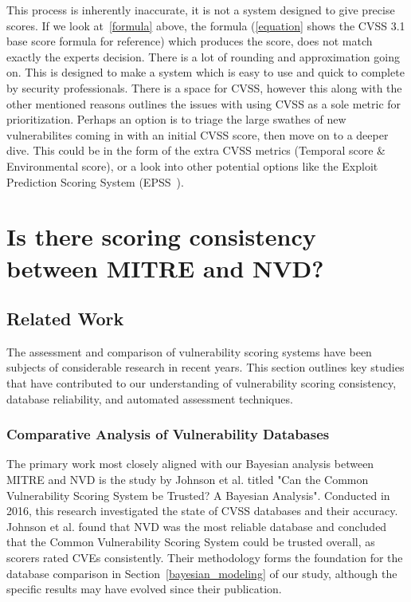 \documentclass[12pt]{article}
\begin{document}
This process is inherently inaccurate, it is not a system designed to give precise scores. If we
look at~\ref{formula} above, the formula (\ref{equation} shows the CVSS 3.1 base score formula for
reference) which produces the score, does not match exactly the experts decision. There is a lot of
rounding and approximation going on. This is designed to make a system which is easy to use and
quick to complete by security professionals. There is a space for CVSS, however this along with the
other mentioned reasons outlines the issues with using CVSS as a sole metric for prioritization. Perhaps an option
is to triage the large swathes of new vulnerabilites coming in with an initial CVSS score, then move
on to a deeper dive. This could be in the form of the extra CVSS metrics (Temporal score \&
Environmental score), or a look into other potential options like the Exploit Prediction Scoring
System (EPSS~\cite{EPSS}).

\section{Is there scoring consistency between MITRE and NVD?}

\subsection{Related Work}

The assessment and comparison of vulnerability scoring systems have been subjects of considerable
research in recent years. This section outlines key studies that have contributed to our
understanding of vulnerability scoring consistency, database reliability, and automated assessment
techniques.

\subsubsection*{Comparative Analysis of Vulnerability Databases}

The primary work most closely aligned with our Bayesian analysis between MITRE and NVD is the study
by Johnson et al. titled "Can the Common Vulnerability Scoring System be Trusted? A Bayesian
Analysis"\cite{bayes}. Conducted in 2016, this research investigated the state of CVSS databases and
their accuracy. Johnson et al. found that NVD was the most reliable database and concluded that the
Common Vulnerability Scoring System could be trusted overall, as scorers rated CVEs consistently.
Their methodology forms the foundation for the database comparison in Section~\ref{bayesian_modeling}
of our study, although the specific results may have evolved since their publication.
\end{document}

